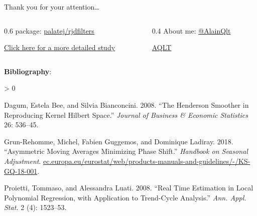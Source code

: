 \documentclass[10pt,xcolor=table,color={dvipsnames,usenames},ignorenonframetext,usepdftitle=false,english]{beamer}
\newlength{\cslhangindent}
\newenvironment{CSLReferences}[2] %
 {%
  \setlength{\parindent}{0pt}
  \ifodd #1 \everypar{\setlength{\hangindent}{\cslhangindent}}\ignorespaces\fi
  \ifnum #2 > 0
  \setlength{\parskip}{#2\baselineskip}
  \fi
 }%
 {}
\newcommand\1{\mathds{1}}
\begin{document}
\begin{frame}[noframenumbering]{Thank you for your attention\ldots{}}
\protect\hypertarget{thank-you-for-your-attention}{}
\begin{columns}
\begin{column}{0.6\textwidth} 
 package: \href{https://github.com/palatej/rjdfilters}{\faGithub{} palatej/rjdfilters}  

\href{https://aqlt.github.io/AsymmetricFilters/Rapport\%20de\%20stage/Rapport.pdf}{\bccrayon Click here for a more detailed study}
\end{column}
\begin{column}{0.4\textwidth}
About me: \href{https://twitter.com/AlainQlt}{\faTwitter{} @AlainQlt}

\href{https://github.com/AQLT}{\faGithub{} AQLT}  
\end{column}
\end{columns}

\textbf{Bibliography}:

\hypertarget{refs}{}
\begin{CSLReferences}{1}{0}
\leavevmode\hypertarget{ref-dagumbianconcini2008}{}%
Dagum, Estela Bee, and Silvia Bianconcini. 2008. {``{The Henderson
Smoother in Reproducing Kernel Hilbert Space}.''} \emph{Journal of
Business \& Economic Statistics} 26: 536--45.

\leavevmode\hypertarget{ref-ch15HBSA}{}%
Grun-Rehomme, Michel, Fabien Guggemos, and Dominique Ladiray. 2018.
{``Asymmetric Moving Averages Minimizing Phase Shift.''} \emph{Handbook
on Seasonal Adjustment}.
\href{https://ec.europa.eu/eurostat/web/products-manuals-and-guidelines/-/KS-GQ-18-001}{ec.europa.eu/eurostat/web/products-manuals-and-guidelines/-/KS-GQ-18-001}.

\leavevmode\hypertarget{ref-proietti2008}{}%
Proietti, Tommaso, and Alessandra Luati. 2008. {``Real Time Estimation
in Local Polynomial Regression, with Application to Trend-Cycle
Analysis.''} \emph{Ann. Appl. Stat.} 2 (4): 1523--53.

\end{CSLReferences}
\end{frame}
\end{document}

